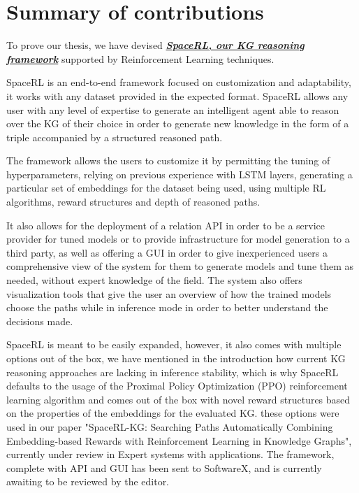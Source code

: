 
\section{Summary of contributions}\label{sec:intro-summary}
To prove our thesis, we have devised \href{https://github.com/DEAL-US/SpaceRL-KG}{\textbf{\textit{SpaceRL, our KG reasoning framework}}} supported by Reinforcement Learning techniques.

SpaceRL is an end-to-end framework focused on customization and adaptability, it works with any dataset provided in the expected format. SpaceRL allows any user with any level of expertise to generate an intelligent agent able to reason over the KG of their choice in order to generate new knowledge in the form of a triple accompanied by a structured reasoned path.

The framework allows the users to customize it by permitting the tuning of hyperparameters, relying on previous experience with LSTM layers, generating a particular set of embeddings for the dataset being used, using multiple RL algorithms, reward structures and depth of reasoned paths.

It also allows for the deployment of a relation API in order to be a service provider for tuned models or to provide infrastructure for model generation to a third party, as well as offering a GUI in order to give inexperienced users a comprehensive view of the system for them to generate models and tune them as needed, without expert knowledge of the field. The system also offers visualization tools that give the user an overview of how the trained models choose the paths while in inference mode in order to better understand the decisions made.

SpaceRL is meant to be easily expanded, however, it also comes with multiple options out of the box, we have mentioned in the introduction how current KG reasoning approaches are lacking in inference stability, which is why SpaceRL defaults to the usage of the Proximal Policy Optimization (PPO) reinforcement learning algorithm and comes out of the box with novel reward structures based on the properties of the embeddings for the evaluated KG. these options were used in our paper "SpaceRL-KG: Searching Paths Automatically Combining Embedding-based Rewards with Reinforcement Learning in Knowledge Graphs", currently under review in Expert systems with applications. The framework, complete with API and GUI has been sent to SoftwareX, and is currently awaiting to be reviewed by the editor.

